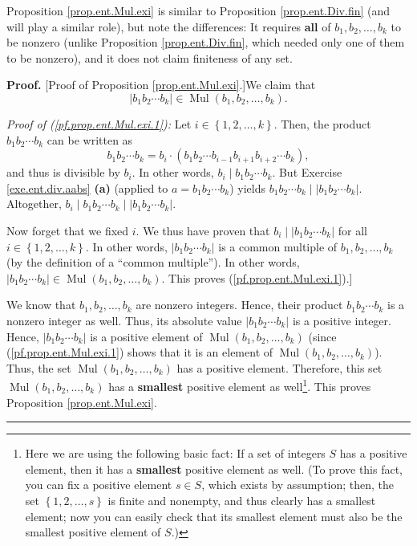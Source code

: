 \documentclass[numbers=enddot,12pt,final,onecolumn,notitlepage]{scrartcl}%
\numberwithin{exer}{subsection}
\theoremstyle{definition}
\newenvironment{proof}[1][Proof]{\noindent\textbf{#1.} }{\ \rule{0.5em}{0.5em}}
\begin{document}
Proposition \ref{prop.ent.Mul.exi} is similar to Proposition
\ref{prop.ent.Div.fin} (and will play a similar role), but note the
differences: It requires \textbf{all} of $b_{1},b_{2},\ldots,b_{k}$ to be
nonzero (unlike Proposition \ref{prop.ent.Div.fin}, which needed only one of
them to be nonzero), and it does not claim finiteness of any set.

\begin{proof}
[Proof of Proposition \ref{prop.ent.Mul.exi}.]We claim that%
\begin{equation}
\left\vert b_{1}b_{2}\cdots b_{k}\right\vert \in\operatorname*{Mul}\left(
b_{1},b_{2},\ldots,b_{k}\right)  . \label{pf.prop.ent.Mul.exi.1}%
\end{equation}


\textit{Proof of (\ref{pf.prop.ent.Mul.exi.1}):} Let $i\in\left\{
1,2,\ldots,k\right\}  $. Then, the product $b_{1}b_{2}\cdots b_{k}$ can be
written as%
\[
b_{1}b_{2}\cdots b_{k}=b_{i}\cdot\left(  b_{1}b_{2}\cdots b_{i-1}%
b_{i+1}b_{i+2}\cdots b_{k}\right)  ,
\]
and thus is divisible by $b_{i}$. In other words, $b_{i}\mid b_{1}b_{2}\cdots
b_{k}$. But Exercise \ref{exe.ent.div.aabs} \textbf{(a)} (applied to
$a=b_{1}b_{2}\cdots b_{k}$) yields $b_{1}b_{2}\cdots b_{k}\mid\left\vert
b_{1}b_{2}\cdots b_{k}\right\vert $. Altogether, $b_{i}\mid b_{1}b_{2}\cdots
b_{k}\mid\left\vert b_{1}b_{2}\cdots b_{k}\right\vert $.

Now forget that we fixed $i$. We thus have proven that $b_{i}\mid\left\vert
b_{1}b_{2}\cdots b_{k}\right\vert $ for all $i\in\left\{  1,2,\ldots
,k\right\}  $. In other words, $\left\vert b_{1}b_{2}\cdots b_{k}\right\vert $
is a common multiple of $b_{1},b_{2},\ldots,b_{k}$ (by the definition of a
\textquotedblleft common multiple\textquotedblright). In other words,
$\left\vert b_{1}b_{2}\cdots b_{k}\right\vert \in\operatorname*{Mul}\left(
b_{1},b_{2},\ldots,b_{k}\right)  $. This proves (\ref{pf.prop.ent.Mul.exi.1}).]

We know that $b_{1},b_{2},\ldots,b_{k}$ are nonzero integers. Hence, their
product $b_{1}b_{2}\cdots b_{k}$ is a nonzero integer as well. Thus, its
absolute value $\left\vert b_{1}b_{2}\cdots b_{k}\right\vert $ is a positive
integer. Hence, $\left\vert b_{1}b_{2}\cdots b_{k}\right\vert $ is a positive
element of $\operatorname*{Mul}\left(  b_{1},b_{2},\ldots,b_{k}\right)  $
(since (\ref{pf.prop.ent.Mul.exi.1}) shows that it is an element of
$\operatorname*{Mul}\left(  b_{1},b_{2},\ldots,b_{k}\right)  $). Thus, the set
$\operatorname*{Mul}\left(  b_{1},b_{2},\ldots,b_{k}\right)  $ has a positive
element. Therefore, this set $\operatorname*{Mul}\left(  b_{1},b_{2}%
,\ldots,b_{k}\right)  $ has a \textbf{smallest} positive element as
well\footnote{Here we are using the following basic fact: If a set of integers
$S$ has a positive element, then it has a \textbf{smallest} positive element
as well. (To prove this fact, you can fix a positive element $s\in S$, which
exists by assumption; then, the set $\left\{  1,2,\ldots,s\right\}  $ is
finite and nonempty, and thus clearly has a smallest element; now you can
easily check that its smallest element must also be the smallest positive
element of $S$.)}. This proves Proposition \ref{prop.ent.Mul.exi}.
\end{proof}
\end{document}
